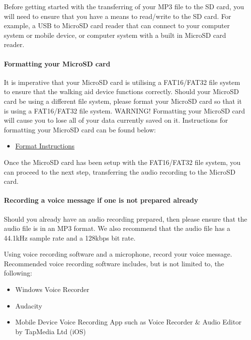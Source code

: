 				Before getting started with the transferring of your MP3 file to the SD card, you will need to ensure that you have a means to read/write to the SD card. For example, a USB to MicroSD card reader that can connect to your computer system or mobile device, or computer system with a built in MicroSD card reader.

				\paragraph{Formatting your MicroSD card}\mbox{}

				It is imperative that your MicroSD card is utilising a FAT16/FAT32 file system to ensure that the walking aid device functions correctly. Should your MicroSD card be using a different file system, please format your MicroSD card so that it is using a FAT16/FAT32 file system. WARNING! Formatting your MicroSD card will cause you to lose all of your data currently saved on it. Instructions for formatting your MicroSD card can be found below:

				\begin{itemize}
					\item \href{https://www.bu.edu/comtech/students/technical-guides/hardware/how-to-format-hard-drives/}{Format Instructions}
				\end{itemize}

				Once the MicroSD card has been setup with the FAT16/FAT32 file system, you can proceed to the next step, transferring the audio recording to the MicroSD card.

				\paragraph{Recording a voice message if one is not prepared already}\mbox{}

				Should you already have an audio recording prepared, then please ensure that the audio file is in an MP3 format. We also recommend that the audio file has a 44.1kHz sample rate and a 128kbps bit rate.

				Using voice recording software and a microphone, record your voice message. Recommended voice recording software includes, but is not limited to, the following:

				\begin{itemize}
					\item Windows Voice Recorder
					\item Audacity
					\item Mobile Device Voice Recording App such as Voice Recorder \& Audio Editor by TapMedia Ltd (iOS)
				\end{itemize}

